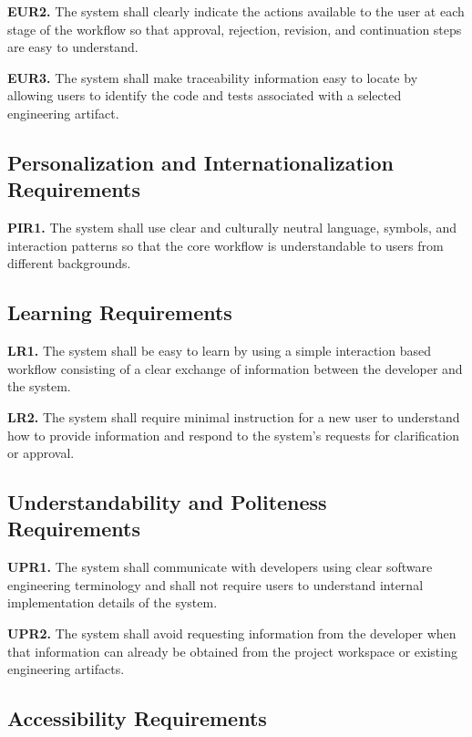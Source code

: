 \documentclass[12pt]{article}
\begin{document}
\noindent\textbf{EUR2.} The system shall clearly indicate the actions available to the user at each stage of the workflow so that approval, rejection, revision, and continuation steps are easy to understand.

\noindent\textbf{EUR3.} The system shall make traceability information easy to locate by allowing users to identify the code and tests associated with a selected engineering artifact.

\subsection{Personalization and Internationalization Requirements}

\noindent\textbf{PIR1.} The system shall use clear and culturally neutral language, symbols, and interaction patterns so that the core workflow is understandable to users from different backgrounds.

\subsection{Learning Requirements}

\noindent\textbf{LR1.} The system shall be easy to learn by using a simple interaction based workflow consisting of a clear exchange of information between the developer and the system.

\noindent\textbf{LR2.} The system shall require minimal instruction for a new user to understand how to provide information and respond to the system's requests for clarification or approval.

\subsection{Understandability and Politeness Requirements}

\noindent\textbf{UPR1.} The system shall communicate with developers using clear software engineering terminology and shall not require users to understand internal implementation details of the system.

\noindent\textbf{UPR2.} The system shall avoid requesting information from the developer when that information can already be obtained from the project workspace or existing engineering artifacts.

\subsection{Accessibility Requirements}
\end{document}
